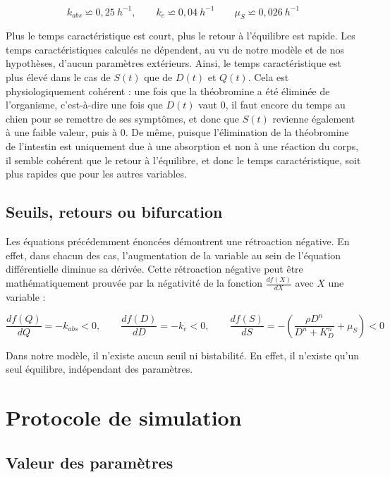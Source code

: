\documentclass[11pt,a4paper]{article}
\begin{document}
\[
k_{abs} \backsimeq 0,25~h^{-1},
\qquad
k_e \backsimeq 0,04~h^{-1}
\qquad
\mu_S \backsimeq 0,026~h^{-1}
\]

Plus le temps caractéristique est court, plus le retour à l'équilibre est rapide.
Les temps caractéristiques calculés ne dépendent, au vu de notre
modèle et de nos hypothèses, d'aucun paramètres extérieurs. Ainsi, le temps caractéristique
est plus élevé dans le cas de $S(t)$ que de $D(t)$ et $Q(t)$. Cela est physiologiquement cohérent : 
une fois que la théobromine a été éliminée de l'organisme, c'est-à-dire une fois que $D(t)$ vaut 0, 
il faut encore du temps au chien pour se remettre de ses symptômes, et donc que $S(t)$ 
revienne également à une faible valeur, puis à 0. De même, puisque l'élimination de la théobromine de l'intestin est 
uniquement due à une absorption et non à une réaction du corps, il semble cohérent que le retour
à l'équilibre, et donc le temps caractéristique, soit plus rapides que pour les autres variables.

\subsection{Seuils, retours ou bifurcation}

Les équations précédemment énoncées démontrent une rétroaction négative. En effet, dans chacun
des cas, l'augmentation de la variable au sein de l'équation différentielle diminue sa dérivée.
Cette rétroaction négative peut être mathématiquement prouvée par la négativité de la fonction 
$\frac{df(X)}{dX}$ avec $X$ une variable : 

\[
\frac{df(Q)}{dQ}=-k_{abs} < 0,
\qquad
\frac{df(D)}{dD}=-k_{e} < 0,
\qquad
\frac{df(S)}{dS}=-(\frac{\rho D^n}{D^n + K_D^n}+\mu_S) < 0
\]

Dans notre modèle, il n'existe aucun seuil ni bistabilité. En effet, il n'existe qu'un seul
équilibre, indépendant des paramètres. 

\section{Protocole de simulation}
\label{sec:simulation-protocol}


\subsection{Valeur des paramètres}
\end{document}

